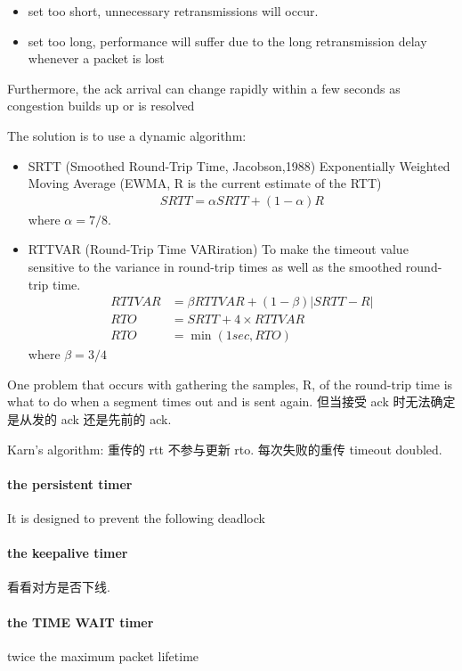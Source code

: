 \begin{itemize}
    \item set too short, unnecessary retransmissions will occur.
    \item set too long, performance will suffer due to the long retransmission delay whenever a packet is lost
\end{itemize}
Furthermore, the ack arrival can change rapidly within a few seconds as
congestion builds up or is resolved

The solution is to use a dynamic algorithm: 
\begin{itemize}\scriptsize
    \item SRTT (Smoothed Round-Trip Time, Jacobson,1988)
    \subitem Exponentially Weighted Moving Average (EWMA, R is the current
    estimate of the RTT)
    \begin{align*}
        SRTT=\alpha SRTT+(1-\alpha)R 
    \end{align*}
    where $\alpha =7/8$. 
    \item RTTVAR (Round-Trip Time VARiration)
    \subitem To make the timeout value sensitive to the variance in round-trip times as well as the smoothed round-trip time.
    \begin{align*}
        RTTVAR &=\beta RTTVAR +(1-\beta) |SRTT-R|\\
        RTO&=SRTT +4\times RTTVAR\\
        RTO&=\min(1 sec , RTO)
    \end{align*}
    where $\beta=3/4$
\end{itemize}


One problem that occurs with gathering the samples, R, of the round-trip time is what to do when a segment times out and is sent again. 但当接受 ack 时无法确定是从发的 ack 还是先前的 ack. 

Karn's algorithm: 重传的 rtt 不参与更新 rto. 每次失败的重传 timeout doubled. 

\paragraph{the persistent timer}It is designed to prevent the following deadlock %

\paragraph{the keepalive timer}看看对方是否下线. 

\paragraph{the TIME WAIT timer}twice the maximum packet lifetime

